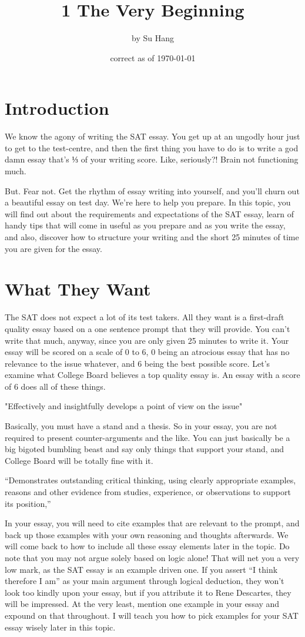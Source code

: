 \documentclass[DIV=calc,11pt,parskip,numbers=noenddot]{scrartcl} %
\title{1 The Very Beginning}
\author{\large by Su Hang}
\date{\small correct as of \today}
\begin{document}
\maketitle
\section{Introduction}
We know the agony of writing the SAT essay. You get up at an ungodly hour just to get to the test-centre, and then the first thing you have to do is to write a god damn essay that’s ⅓ of your writing score. Like, seriously?! Brain not functioning much.

But. Fear not. Get the rhythm of essay writing into yourself, and you’ll churn out a beautiful essay on test day. We’re here to help you prepare. In this topic, you will find out about the requirements and expectations of the SAT essay, learn of handy tips that will come in useful as you prepare and as you write the essay, and also, discover how to structure your writing and the short 25 minutes of time you are given for the essay.
\section{What They Want}
The SAT does not expect a lot of its test takers. All they want is a first-draft quality essay based on a one sentence prompt that they will provide. You can’t write that much, anyway, since you are only given 25 minutes to write it. Your essay will be scored on a scale of 0 to 6, 0 being an atrocious essay that has no relevance to the issue whatever, and 6 being the best possible score. Let’s examine what College Board believes a top quality essay is. An essay with a score of 6 does all of these things.

"Effectively and insightfully develops a point of view on the issue"

Basically, you must have a stand and a thesis. So in your essay, you are not required to present counter-arguments and the like. You can just basically be a big bigoted bumbling beast and say only things that support your stand, and College Board will be totally fine with it.

“Demonstrates outstanding critical thinking, using clearly appropriate examples, reasons and other evidence from studies, experience, or observations to support its position,”

In your essay, you will need to cite examples that are relevant to the prompt, and back up those examples with your own reasoning and thoughts afterwards. We will come back to how to include all these essay elements later in the topic. Do note that you may not argue solely based on logic alone! That will net you a very low mark, as the SAT essay is an example driven one. If you assert “I think therefore I am” as your main argument through logical deduction, they won’t look too kindly upon your essay, but if you attribute it to Rene Descartes, they will be impressed. At the very least, mention one example in your essay and expound on that throughout. I will teach you how to pick examples for your SAT essay wisely later in this topic.
\end{document}
